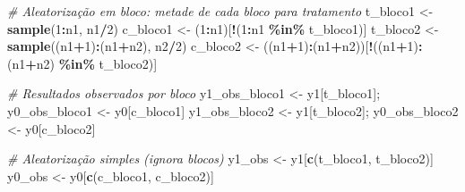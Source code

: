 \documentclass[
]{article}
\newenvironment{Shaded}{\begin{snugshade}}{\end{snugshade}}
\newcommand{\CommentTok}[1]{\textcolor[rgb]{0.56,0.35,0.01}{\textit{#1}}}
\newcommand{\DecValTok}[1]{\textcolor[rgb]{0.00,0.00,0.81}{#1}}
\newcommand{\FunctionTok}[1]{\textcolor[rgb]{0.13,0.29,0.53}{\textbf{#1}}}
\newcommand{\NormalTok}[1]{#1}
\newcommand{\OtherTok}[1]{\textcolor[rgb]{0.56,0.35,0.01}{#1}}
\newcommand{\SpecialCharTok}[1]{\textcolor[rgb]{0.81,0.36,0.00}{\textbf{#1}}}
\begin{document}
\begin{Shaded}
\begin{Highlighting}[]
\CommentTok{\# Aleatorização em bloco: metade de cada bloco para tratamento}
\NormalTok{t\_bloco1 }\OtherTok{\textless{}{-}} \FunctionTok{sample}\NormalTok{(}\DecValTok{1}\SpecialCharTok{:}\NormalTok{n1, n1}\SpecialCharTok{/}\DecValTok{2}\NormalTok{)}
\NormalTok{c\_bloco1 }\OtherTok{\textless{}{-}}\NormalTok{ (}\DecValTok{1}\SpecialCharTok{:}\NormalTok{n1)[}\SpecialCharTok{!}\NormalTok{(}\DecValTok{1}\SpecialCharTok{:}\NormalTok{n1 }\SpecialCharTok{\%in\%}\NormalTok{ t\_bloco1)]}
\NormalTok{t\_bloco2 }\OtherTok{\textless{}{-}} \FunctionTok{sample}\NormalTok{((n1}\SpecialCharTok{+}\DecValTok{1}\NormalTok{)}\SpecialCharTok{:}\NormalTok{(n1}\SpecialCharTok{+}\NormalTok{n2), n2}\SpecialCharTok{/}\DecValTok{2}\NormalTok{)}
\NormalTok{c\_bloco2 }\OtherTok{\textless{}{-}}\NormalTok{ ((n1}\SpecialCharTok{+}\DecValTok{1}\NormalTok{)}\SpecialCharTok{:}\NormalTok{(n1}\SpecialCharTok{+}\NormalTok{n2))[}\SpecialCharTok{!}\NormalTok{((n1}\SpecialCharTok{+}\DecValTok{1}\NormalTok{)}\SpecialCharTok{:}\NormalTok{(n1}\SpecialCharTok{+}\NormalTok{n2) }\SpecialCharTok{\%in\%}\NormalTok{ t\_bloco2)]}

\CommentTok{\# Resultados observados por bloco}
\NormalTok{y1\_obs\_bloco1 }\OtherTok{\textless{}{-}}\NormalTok{ y1[t\_bloco1]; y0\_obs\_bloco1 }\OtherTok{\textless{}{-}}\NormalTok{ y0[c\_bloco1]}
\NormalTok{y1\_obs\_bloco2 }\OtherTok{\textless{}{-}}\NormalTok{ y1[t\_bloco2]; y0\_obs\_bloco2 }\OtherTok{\textless{}{-}}\NormalTok{ y0[c\_bloco2]}

\CommentTok{\# Aleatorização simples (ignora blocos)}
\NormalTok{y1\_obs }\OtherTok{\textless{}{-}}\NormalTok{ y1[}\FunctionTok{c}\NormalTok{(t\_bloco1, t\_bloco2)]}
\NormalTok{y0\_obs }\OtherTok{\textless{}{-}}\NormalTok{ y0[}\FunctionTok{c}\NormalTok{(c\_bloco1, c\_bloco2)]}
\end{Highlighting}
\end{Shaded}
\end{document}
